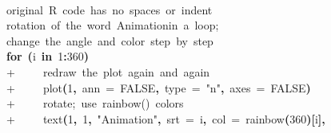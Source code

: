 \documentclass[english,noae,nogin]{article}
\newcommand{\hlnumber}[1]{\textcolor[rgb]{0.0823529411764706,0.0784313725490196,0.709803921568627}{#1}}%
\newcommand{\hlfunctioncall}[1]{\textcolor[rgb]{1,0,0}{#1}}%
\newcommand{\hlstring}[1]{\textcolor[rgb]{0.6,0.6,1}{#1}}%
\newcommand{\hlkeyword}[1]{\textcolor[rgb]{0,0,0}{\textbf{#1}}}%
\newcommand{\hlargument}[1]{\textcolor[rgb]{0.694117647058824,0.247058823529412,0.0196078431372549}{#1}}%
\newcommand{\hlcomment}[1]{\textcolor[rgb]{0.8,0.8,0.8}{#1}}%
\newcommand{\hlsymbol}[1]{\textcolor[rgb]{0,0,0}{#1}}%
\newcommand{\hlprompt}[1]{\textcolor[rgb]{0,0,0}{#1}}%
\newcommand{\hlstd}[1]{\textcolor[rgb]{0,0,0}{#1}}%
\newenvironment{Houtput}{\raggedright}{%
%
}
\begin{document}
\begin{Houtput}
\hspace*{\fill}\\
\hlstd{}\ttfamily\noindent
\hlprompt{\usebox{\hlnormalsizeboxgreaterthan}{\ }}\hlcomment{\usebox{\hlnormalsizeboxhash}\usebox{\hlnormalsizeboxhash}{\ }original{\ }R{\ }code{\ }has{\ }no{\ }spaces{\ }or{\ }indent}\mbox{}
\normalfont
\hspace*{\fill}\\
\hlstd{}\ttfamily\noindent
\hlprompt{\usebox{\hlnormalsizeboxgreaterthan}{\ }}\hlcomment{\usebox{\hlnormalsizeboxhash}\usebox{\hlnormalsizeboxhash}{\ }rotation{\ }of{\ }the{\ }word{\ }\usebox{\hlnormalsizeboxsinglequote}Animation\usebox{\hlnormalsizeboxsinglequote}{\ }in{\ }a{\ }loop;}\mbox{}
\normalfont
\hspace*{\fill}\\
\hlstd{}\ttfamily\noindent
\hlprompt{\usebox{\hlnormalsizeboxgreaterthan}{\ }}\hlcomment{\usebox{\hlnormalsizeboxhash}{\ }{\ }{\ }change{\ }the{\ }angle{\ }and{\ }color{\ }step{\ }by{\ }step}\mbox{}
\normalfont
\hspace*{\fill}\\
\hlstd{}\ttfamily\noindent
\hlprompt{\usebox{\hlnormalsizeboxgreaterthan}{\ }}\hlkeyword{for}{\ }\hlkeyword{(}\hlsymbol{i}{\ }\hlkeyword{in}{\ }\hlnumber{1}\hlkeyword{:}\hlnumber{360}\hlkeyword{)}{\ }\hlkeyword{\usebox{\hlnormalsizeboxopenbrace}}\hspace*{\fill}\\
\hlstd{}\hlprompt{+{\ }}{\ }{\ }{\ }{\ }\hlcomment{\usebox{\hlnormalsizeboxhash}{\ }redraw{\ }the{\ }plot{\ }again{\ }and{\ }again}\hspace*{\fill}\\
\hlstd{}\hlprompt{+{\ }}{\ }{\ }{\ }{\ }\hlfunctioncall{plot}\hlkeyword{(}\hlnumber{1}\hlkeyword{,}{\ }\hlargument{ann}{\ }\hlargument{=}{\ }\hlnumber{FALSE}\hlkeyword{,}{\ }\hlargument{type}{\ }\hlargument{=}{\ }\hlstring{"n"}\hlkeyword{,}{\ }\hlargument{axes}{\ }\hlargument{=}{\ }\hlnumber{FALSE}\hlkeyword{)}\hspace*{\fill}\\
\hlstd{}\hlprompt{+{\ }}{\ }{\ }{\ }{\ }\hlcomment{\usebox{\hlnormalsizeboxhash}{\ }rotate;{\ }use{\ }rainbow(){\ }colors}\hspace*{\fill}\\
\hlstd{}\hlprompt{+{\ }}{\ }{\ }{\ }{\ }\hlfunctioncall{text}\hlkeyword{(}\hlnumber{1}\hlkeyword{,}{\ }\hlnumber{1}\hlkeyword{,}{\ }\hlstring{"Animation"}\hlkeyword{,}{\ }\hlargument{srt}{\ }\hlargument{=}{\ }\hlsymbol{i}\hlkeyword{,}{\ }\hlargument{col}{\ }\hlargument{=}{\ }\hlfunctioncall{rainbow}\hlkeyword{(}\hlnumber{360}\hlkeyword{)}\hlkeyword{[}\hlsymbol{i}\hlkeyword{]}\hlkeyword{,}\hspace*{\fill}\\

\end{Houtput}
\end{document}
